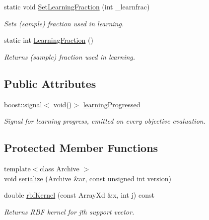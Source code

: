 \begin{DoxyCompactItemize}
static void \hyperlink{class_go_s_u_m_1_1_c_single_a_m_ae15b71d7a55ae43a9543610bb2f060b7}{Set\-Learning\-Fraction} (int \-\_\-learnfrac)
\begin{DoxyCompactList}\small\item\em Sets (sample) fraction used in learning. \end{DoxyCompactList}\item 
static int \hyperlink{class_go_s_u_m_1_1_c_single_a_m_a63ac2d01d9dc387ff0dc2fa57528544b}{Learning\-Fraction} ()
\begin{DoxyCompactList}\small\item\em Returns (sample) fraction used in learning. \end{DoxyCompactList}\end{DoxyCompactItemize}
\subsection*{Public Attributes}
\begin{DoxyCompactItemize}
\item 
boost\-::signal$<$ void()$>$ \hyperlink{class_go_s_u_m_1_1_c_single_a_m_aeb0dea2fcd2ba48e5853c56f1a5b3fe6}{learning\-Progressed}
\begin{DoxyCompactList}\small\item\em Signal for learning progress, emitted on every objective evaluation. \end{DoxyCompactList}\end{DoxyCompactItemize}
\subsection*{Protected Member Functions}
\begin{DoxyCompactItemize}
\item 
{\footnotesize template$<$class Archive $>$ }\\void \hyperlink{class_go_s_u_m_1_1_c_single_a_m_a761e514fefeb7324e5509571f1be3848}{serialize} (Archive \&ar, const unsigned int version)
\item 
double \hyperlink{class_go_s_u_m_1_1_c_single_a_m_a1dec1e621ca86dfb37ae91d9b07490f2}{rbf\-Kernel} (const Array\-Xd \&x, int j) const 
\begin{DoxyCompactList}\small\item\em Returns R\-B\-F kernel for jth support vector. \end{DoxyCompactList}\end{DoxyCompactItemize}
